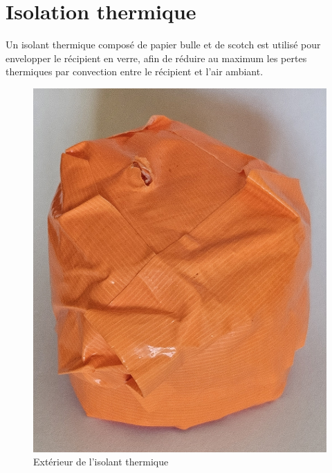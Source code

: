 \section{Isolation thermique}

Un isolant thermique composé de papier bulle et de scotch est utilisé pour envelopper le récipient en verre, afin de réduire au maximum les pertes thermiques par convection entre le récipient et l’air ambiant.

\begin{figure}[H]
    \centering
    \begin{minipage}{0.48\textwidth}
        \centering
        \includegraphics[width=\textwidth]{assets/figures/Exterieur_Isolant.jpg}
        \caption{Extérieur de l'isolant thermique}
        \label{fig:Exterieur_Isolant}
    \end{minipage}\hfill
    \begin{minipage}{0.48\textwidth}
        \centering

\end{minipage}
\end{figure}
